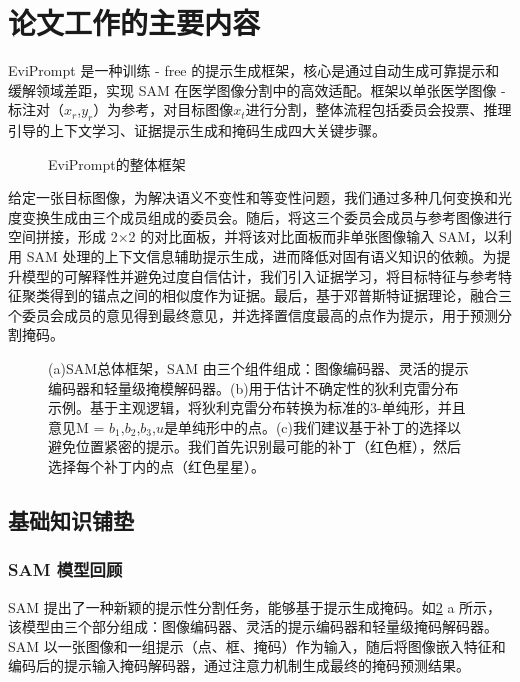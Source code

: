 \documentclass[12pt,a4paper]{article}
\begin{document}
	\section{论文工作的主要内容}
	EviPrompt 是一种训练 - free 的提示生成框架，核心是通过自动生成可靠提示和缓解领域差距，实现 SAM 在医学图像分割中的高效适配。框架以单张医学图像 - 标注对（$x_r​$,$y_r​$）为参考，对目标图像$x_t​$进行分割，整体流程包括委员会投票、推理引导的上下文学习、证据提示生成和掩码生成四大关键步骤。\par 
	\begin{figure}[H]
		\centering
		\caption{EviPrompt的整体框架}
		\label{fig:screenshot002}
	\end{figure}
	给定一张目标图像，为解决语义不变性和等变性问题，我们通过多种几何变换和光度变换生成由三个成员组成的委员会。随后，将这三个委员会成员与参考图像进行空间拼接，形成 2×2 的对比面板，并将该对比面板而非单张图像输入 SAM，以利用 SAM 处理的上下文信息辅助提示生成，进而降低对固有语义知识的依赖。为提升模型的可解释性并避免过度自信估计，我们引入证据学习，将目标特征与参考特征聚类得到的锚点之间的相似度作为证据。最后，基于邓普斯特证据理论，融合三个委员会成员的意见得到最终意见，并选择置信度最高的点作为提示，用于预测分割掩码。
	\begin{figure}[H]
		\centering
		\caption{(a)SAM总体框架，SAM 由三个组件组成：图像编码器、灵活的提示编码器和轻量级掩模解码器。(b)用于估计不确定性的狄利克雷分布示例。基于主观逻辑，将狄利克雷分布转换为标准的3-单纯形，并且意见M = {$b_1$,$b_2$,$b_3$,$u$}是单纯形中的点。(c)我们建议基于补丁的选择以避免位置紧密的提示。我们首先识别最可能的补丁（红色框），然后选择每个补丁内的点（红色星星）。}
		\label{fig:screenshot004}
	\end{figure}
	\subsection{基础知识铺垫}
	\subsubsection{SAM 模型回顾}
	SAM 提出了一种新颖的提示性分割任务，能够基于提示生成掩码。如\cref{fig:screenshot004} a 所示，该模型由三个部分组成：图像编码器、灵活的提示编码器和轻量级掩码解码器。SAM 以一张图像和一组提示（点、框、掩码）作为输入，随后将图像嵌入特征和编码后的提示输入掩码解码器，通过注意力机制生成最终的掩码预测结果。
	
\end{document}
